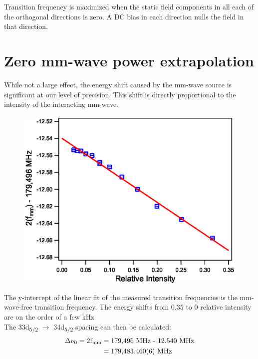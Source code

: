 \documentclass[landscape]{sciposter}
\begin{document}
\begin{multicols}{4}
Transition frequency is maximized when the static field components in all each of the orthogonal directions is zero. A DC bias in each direction nulls the field in that direction. 

\section*{\large Zero mm-wave power extrapolation}
While not a large effect, the energy shift caused by the mm-wave source is significant at our level of precision. This shift is directly proportional to the intensity of the interacting mm-wave. 

\begin{figure}
\begin{center}
\includegraphics[scale = 0.9]{33d52_PScans.eps}
\caption{}
\label{Power}
\end{center}
\end{figure}

The y-intercept of the linear fit of the measured transition frequencies is the mm-wave-free transition frequency. The energy shifts from 0.35 to 0 relative intensity are on the order of a few kHz.\\

The 33d\textsubscript{5/2} $\rightarrow$ 34d\textsubscript{5/2} spacing can then be calculated:
\begin{align*}
\Delta \nu_0 = \textrm{2f\textsubscript{mm}} &= \textrm{179,496 MHz - 12.540 MHz} \\ &= \textrm{179,483.460(6) MHz}
\end{align*}




\end{multicols}
\end{document}
